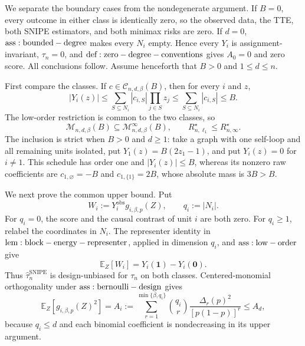 We separate the boundary cases from the nondegenerate argument. If \(B=0\), every outcome in either class is identically zero, so the observed data, the TTE, both SNIPE estimators, and both minimax risks are zero. If \(d=0\), \({\rm ass:bounded-degree}\) makes every \(N_i\) empty. Hence every \(Y_i\) is assignment-invariant, \(\tau_n=0\), and \({\rm def:zero-degree-conventions}\) gives \(A_0=0\) and zero score. All conclusions follow. Assume henceforth that \(B>0\) and \(1\le d\le n\).

First compare the classes. If \(c\in\mathcal C_{n,d,\beta}(B)\), then for every \(i\) and \(z\),
\[
|Y_i(z)|
\le\sum_{S\subseteq N_i}|c_{i,S}|\prod_{j\in S}z_j
\le\sum_{S\subseteq N_i}|c_{i,S}|
\le B.
\]
The low-order restriction is common to the two classes, so
\[
\mathcal M_{n,d,\beta}(B)\subseteq\mathcal M_{n,d,\beta}^{\infty}(B),
\qquad
R_{n,\ell_1}^\star\le R_{n,\infty}^\star.
\]
The inclusion is strict when \(B>0\) and \(d\ge1\): take a graph with one self-loop and all remaining units isolated, put \(Y_1(z)=B(2z_1-1)\), and put \(Y_i(z)=0\) for \(i\ne1\). This schedule has order one and \(|Y_i(z)|\le B\), whereas its nonzero raw coefficients are \(c_{1,\varnothing}=-B\) and \(c_{1,\{1\}}=2B\), whose absolute mass is \(3B>B\).

We next prove the common upper bound. Put
\[
W_i:=Y_i^{\mathrm{obs}}g_{i,\beta,p}(Z),
\qquad q_i:=|N_i|.
\]
For \(q_i=0\), the score and the causal contrast of unit \(i\) are both zero. For \(q_i\ge1\), relabel the coordinates in \(N_i\). The representer identity in \({\rm lem:block-energy-representer}\), applied in dimension \(q_i\), and \({\rm ass:low-order}\) give
\[
\mathbb E_Z[W_i]=Y_i(\mathbf1)-Y_i(\mathbf0).
\]
Thus \(\widehat\tau_n^{\mathrm{SNIPE}}\) is design-unbiased for \(\tau_n\) on both classes. Centered-monomial orthogonality under \({\rm ass:bernoulli-design}\) gives
\[
\mathbb E_Z[g_{i,\beta,p}(Z)^2]
=A_i:=\sum_{r=1}^{\min\{\beta,q_i\}}
\binom{q_i}{r}\frac{\Delta_r(p)^2}{[p(1-p)]^r}
\le A_d,
\]
because \(q_i\le d\) and each binomial coefficient is nondecreasing in its upper argument.

